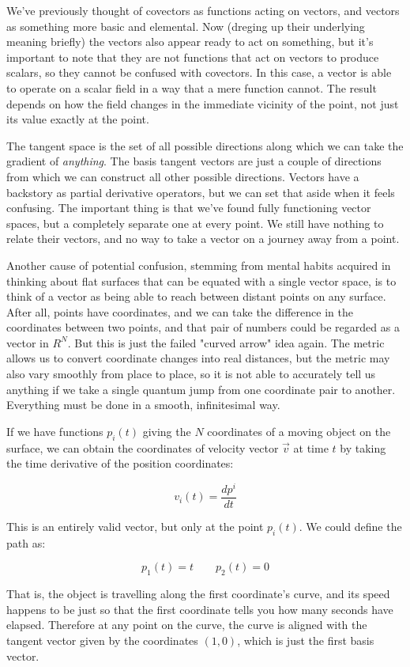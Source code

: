 We've previously thought of covectors as functions acting on vectors, and vectors as something more basic and elemental. Now (dreging up their underlying meaning briefly) the vectors also appear ready to act on something, but it's important to note that they are not functions that act on vectors to produce scalars, so they cannot be confused with covectors. In this case, a vector is able to operate on a scalar field in a way that a mere function cannot. The result depends on how the field changes in the immediate vicinity of the point, not just its value exactly at the point.

The tangent space is the set of all possible directions along which we can take the gradient of \textit{anything}. The basis tangent vectors are just a couple of directions from which we can construct all other possible directions. Vectors have a backstory as partial derivative operators, but we can set that aside when it feels confusing. The important thing is that we've found fully functioning vector spaces, but a completely separate one at every point. We still have nothing to relate their vectors, and no way to take a vector on a journey away from a point.

Another cause of potential confusion, stemming from mental habits acquired in thinking about flat surfaces that can be equated with a single vector space, is to think of a vector as being able to reach between distant points on any surface. After all, points have coordinates, and we can take the difference in the coordinates between two points, and that pair of numbers could be regarded as a vector in $R^N$. But this is just the failed "curved arrow" idea again. The metric allows us to convert coordinate changes into real distances, but the metric may also vary smoothly from place to place, so it is not able to accurately tell us anything if we take a single quantum jump from one coordinate pair to another. Everything must be done in a smooth, infinitesimal way.

If we have functions $p_i(t)$ giving the $N$ coordinates of a moving object on the surface, we can obtain the coordinates of velocity vector $\vec{v}$ at time $t$ by taking the time derivative of the position coordinates:

$$
v_i(t) = \frac{d p^i}{dt}
$$

This is an entirely valid vector, but only at the point $p_i(t)$. We could define the path as:

$$
p_1(t) = t \quad \quad p_2(t) = 0
$$

That is, the object is travelling along the first coordinate's curve, and its speed happens to be just so that the first coordinate tells you how many seconds have elapsed. Therefore at any point on the curve, the curve is aligned with the tangent vector given by the coordinates $(1, 0)$, which is just the first basis vector.

